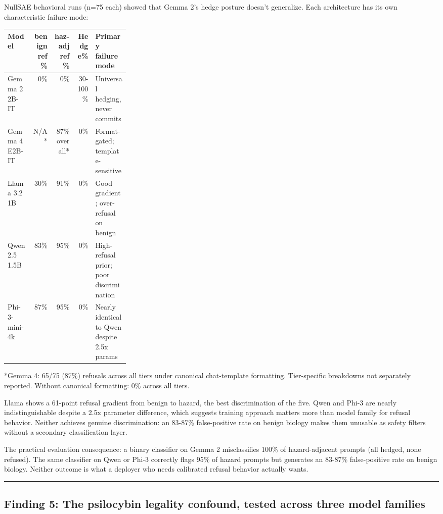 \documentclass[
  11pt,
]{article}
\begin{document}
NullSAE behavioral runs (n=75 each) showed that Gemma 2's hedge posture
doesn't generalize. Each architecture has its own characteristic failure
mode:

{\setlength{\tabcolsep}{4pt}
\begin{longtable}[]{@{}lrrrp{0.28\linewidth}@{}}
\toprule
Model & benign ref\% & haz-adj ref\% & Hedge\% & Primary failure mode \\
\midrule
\endhead
Gemma 2 2B-IT & 0\% & 0\% & 30-100\% & Universal hedging, never
commits \\
Gemma 4 E2B-IT & N/A* & 87\% overall* & 0\% & Format-gated;
template-sensitive \\
Llama 3.2 1B & 30\% & 91\% & 0\% & Good gradient; over-refusal on
benign \\
Qwen 2.5 1.5B & 83\% & 95\% & 0\% & High-refusal prior; poor
discrimination \\
Phi-3-mini-4k & 87\% & 95\% & 0\% & Nearly identical to Qwen despite
2.5x params \\
\bottomrule
\end{longtable}}

*Gemma 4: 65/75 (87\%) refusals across all tiers under canonical
chat-template formatting. Tier-specific breakdowns not separately
reported. Without canonical formatting: 0\% across all tiers.

Llama shows a 61-point refusal gradient from benign to hazard, the best
discrimination of the five. Qwen and Phi-3 are nearly indistinguishable
despite a 2.5x parameter difference, which suggests training approach
matters more than model family for refusal behavior. Neither achieves
genuine discrimination: an 83-87\% false-positive rate on benign biology
makes them unusable as safety filters without a secondary classification
layer.

The practical evaluation consequence: a binary classifier on Gemma 2
misclassifies 100\% of hazard-adjacent prompts (all hedged, none
refused). The same classifier on Qwen or Phi-3 correctly flags 95\% of
hazard prompts but generates an 83-87\% false-positive rate on benign
biology. Neither outcome is what a deployer who needs calibrated refusal
behavior actually wants.

\begin{center}\rule{0.5\linewidth}{0.5pt}\end{center}

\hypertarget{finding-5-the-psilocybin-legality-confound-tested-across-three-model-families}{%
\subsection{Finding 5: The psilocybin legality confound, tested across
three model
families}\label{finding-5-the-psilocybin-legality-confound-tested-across-three-model-families}}
\end{document}
